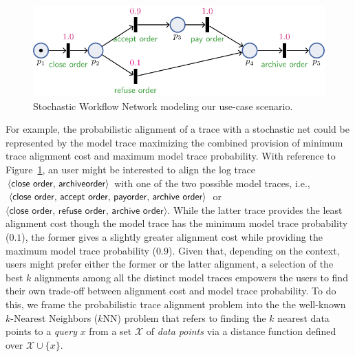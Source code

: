\begin{figure}[!t]
	\centering
	\includegraphics[width=.6\textwidth]{images/petri_tut.pdf}
	\caption{Stochastic Workflow Network modeling our use-case scenario.}\label{fig:petri_tut}
\end{figure}
For example, the probabilistic alignment of a trace with a stochastic net could be represented by the model trace maximizing the combined provision of minimum trace alignment cost and maximum model trace probability. With reference to Figure~\ref{fig:petri_tut}, an user might be interested to align the log trace $\langle \textsf{close order},\,\textsf{archive}\\ \textsf{order}\rangle$ with one of the two possible model traces, i.e., $\langle\textsf{close order},\,\textsf{accept order},\,\textsf{pay}\\\textsf{order},\,\textsf{archive order}\rangle$ or $\langle\textsf{close order},\,\textsf{refuse order},\,\textsf{archive order}\rangle$. While the  latter trace provides the least alignment cost though the model trace has the minimum model trace probability ($0.1$), the former gives a slightly greater alignment cost while providing the maximum model trace probability ($0.9$). Given that, depending on the context, users might prefer either the former or the latter alignment, a selection of the best $k$ alignments among all the distinct model traces empowers the users to find their own trade-off between alignment cost and model trace probability.
To do this, we frame the probabilistic trace alignment problem into the the well-known $k$-Nearest Neighbors ($k$NN) problem \cite{Altman} that refers to finding the $k$ nearest data points to a \textit{query} $x$ from a set $\mathcal{X}$ of \textit{data points} via a distance function defined over $\mathcal{X}\cup\{x\}$.



